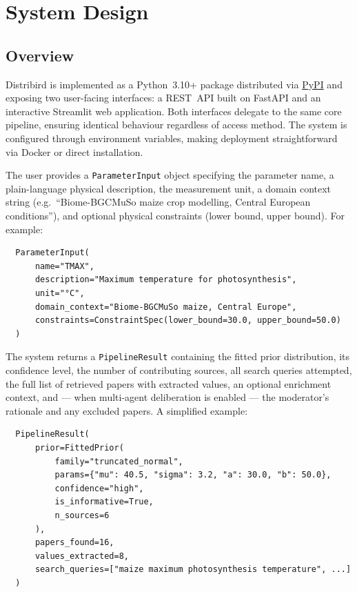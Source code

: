 \documentclass[11pt,a4paper]{article}
\begin{document}
\section{System Design}

\subsection{Overview}

Distribird is implemented as a Python~3.10+ package distributed via \href{https://pypi.org/project/distribird/}{PyPI} and exposing two user-facing interfaces: a REST~API built on FastAPI and an interactive Streamlit web application. Both interfaces delegate to the same core pipeline, ensuring identical behaviour regardless of access method. The system is configured through environment variables, making deployment straightforward via Docker or direct installation.

The user provides a \texttt{ParameterInput} object specifying the parameter name, a plain-language physical description, the measurement unit, a domain context string (e.g.\ ``Biome-BGCMuSo maize crop modelling, Central European conditions''), and optional physical constraints (lower bound, upper bound). For example:

\begin{verbatim}
  ParameterInput(
      name="TMAX",
      description="Maximum temperature for photosynthesis",
      unit="°C",
      domain_context="Biome-BGCMuSo maize, Central Europe",
      constraints=ConstraintSpec(lower_bound=30.0, upper_bound=50.0)
  )
\end{verbatim}

\noindent The system returns a \texttt{PipelineResult} containing the fitted prior distribution, its confidence level, the number of contributing sources, all search queries attempted, the full list of retrieved papers with extracted values, an optional enrichment context, and --- when multi-agent deliberation is enabled --- the moderator's rationale and any excluded papers. A simplified example:

\begin{verbatim}
  PipelineResult(
      prior=FittedPrior(
          family="truncated_normal",
          params={"mu": 40.5, "sigma": 3.2, "a": 30.0, "b": 50.0},
          confidence="high",
          is_informative=True,
          n_sources=6
      ),
      papers_found=16,
      values_extracted=8,
      search_queries=["maize maximum photosynthesis temperature", ...]
  )
\end{verbatim}
\end{document}
